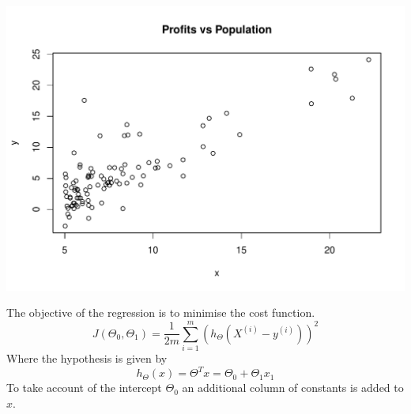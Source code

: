 \documentclass[12pt, a4paper, oneside]{article} %
\begin{document}
\begin{knitrout}
\color{fgcolor}\begin{kframe}
\begin{alltt}
 \hlkwb{<-} \hlstd{(}\hlstd{)}
 \hlkwb{<-} \hlopt{$}
 \hlkwb{<-} \hlopt{$}
 \hlopt{~}   \hlstd{=} \hlstd{)}
\end{alltt}
\end{kframe}
\includegraphics[width=\maxwidth]{figure/Regression} 

\end{knitrout}
The objective of the regression is to minimise the cost function.
\begin{equation}
J(\Theta_0, \Theta_1) = \frac{1}{2m} \sum_{i=1}^m (h_{\Theta}(X^{(i)} - y^{(i)}))^2
\end{equation}
Where the hypothesis is given by 
\begin{equation}
h_{\Theta}(x) = \Theta^Tx = \Theta_0 + \Theta_1x_1
\end{equation}
To take account of the intercept $\Theta_0$ an additional column of constants is added to $x$. 
\end{document}
